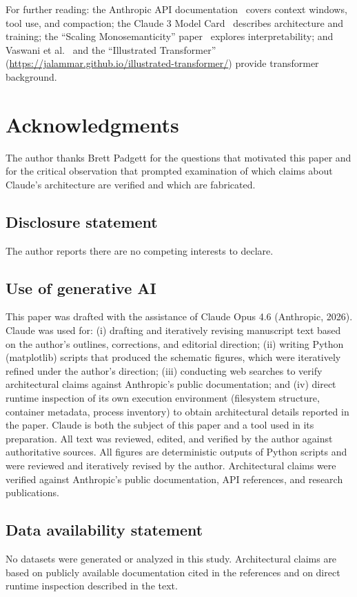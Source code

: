 \documentclass[12pt]{article}
\begin{document}
For further reading: the Anthropic API documentation~\cite{anthropic_api_docs} covers context windows, tool use, and compaction; the Claude 3 Model Card~\cite{anthropic_model_card} describes architecture and training; the ``Scaling Monosemanticity'' paper~\cite{scaling_monosemanticity} explores interpretability; and Vaswani et al.~\cite{vaswani2017attention} and the ``Illustrated Transformer'' (\url{https://jalammar.github.io/illustrated-transformer/}) provide transformer background.

\section*{Acknowledgments}
The author thanks Brett Padgett for the questions that motivated this paper and for the critical observation that prompted examination of which claims about Claude's architecture are verified and which are fabricated.


\subsection*{Disclosure statement}
The author reports there are no competing interests to declare.

\subsection*{Use of generative AI}
This paper was drafted with the assistance of Claude Opus 4.6 (Anthropic, 2026). Claude was used for: (i) drafting and iteratively revising manuscript text based on the author's outlines, corrections, and editorial direction; (ii) writing Python (matplotlib) scripts that produced the schematic figures, which were iteratively refined under the author's direction; (iii) conducting web searches to verify architectural claims against Anthropic's public documentation; and (iv) direct runtime inspection of its own execution environment (filesystem structure, container metadata, process inventory) to obtain architectural details reported in the paper. Claude is both the subject of this paper and a tool used in its preparation. All text was reviewed, edited, and verified by the author against authoritative sources. All figures are deterministic outputs of Python scripts and were reviewed and iteratively revised by the author. Architectural claims were verified against Anthropic's public documentation, API references, and research publications.

\subsection*{Data availability statement}
No datasets were generated or analyzed in this study. Architectural claims are based on publicly available documentation cited in the references and on direct runtime inspection described in the text.
\end{document}
